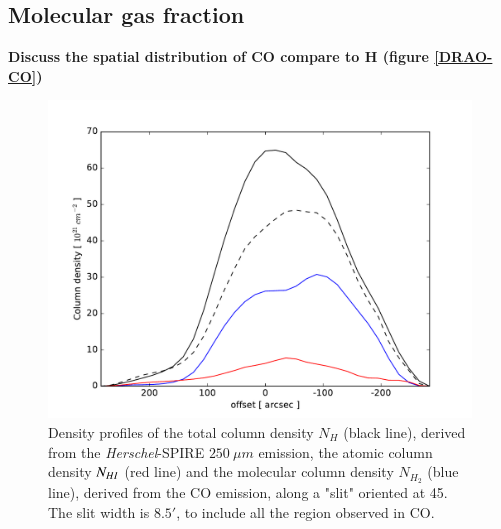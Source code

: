 \documentclass[traditabstract]{aa}
\begin{document}
   \subsection{Molecular gas fraction}

\textbf{Discuss the spatial distribution of CO compare to H (figure \ref{DRAO-CO})}

\begin{figure}[h!]
  \centering
  \includegraphics[width=\linewidth,trim=30 10 55 35,clip=true]{Figures/Column_density_profiles.pdf}
  \caption{\label{Col_density} Density profiles of the total column density $N_H$ (black line), derived from the \emph{Herschel}-SPIRE $250\: \mu m$ emission, the atomic column density $N_{H\rmnum{1}}$ (red line) and the molecular column density $N_{H_2}$ (blue line), derived from the CO emission, along a "slit" oriented at 45\degree. The slit width is $8.5'$, to include all the region observed in CO.}
\end{figure}
\end{document}
